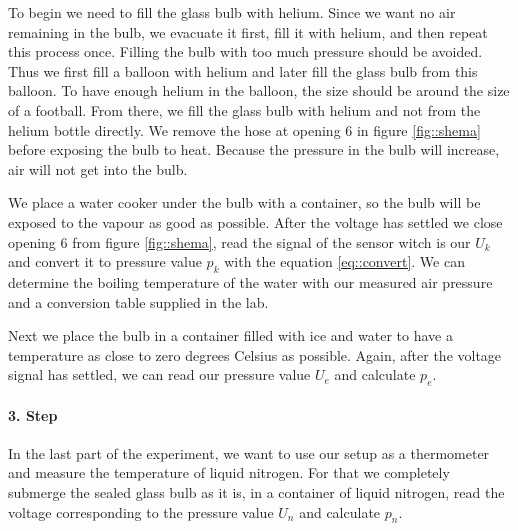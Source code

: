 To begin we need to fill the glass bulb with helium. 
Since we want no air remaining in the bulb, we evacuate it first, fill it with helium, and then repeat this process once. 
Filling the bulb with too much pressure should be avoided.
Thus we first fill a balloon with helium and later fill the glass bulb from this balloon. 
To have enough helium in the balloon, the size should be around the size of a football. 
From there, we fill the glass bulb with helium and not from the helium bottle directly. 
We remove the hose at opening 6 in figure \ref{fig::shema} before exposing the bulb to heat. 
Because the pressure in the bulb will increase, air will not get into the bulb. 


We place a water cooker under the bulb with a container, so the bulb will be exposed to the vapour as good as possible. 
After the voltage has settled we close opening 6 from figure \ref{fig::shema}, read the signal of the sensor witch is our $U_k$ and convert it to pressure value $p_k$ with the  equation \ref{eq::convert}. 
We can determine the boiling temperature of the water with our measured air pressure and a conversion table supplied in the lab. 


Next we place the bulb in a container filled with ice and water to have a temperature as close to zero degrees Celsius as possible. 
Again, after the voltage signal has settled, we can read our pressure value $U_e$ and calculate $p_e$.

\paragraph{3. Step}
In the last part of the experiment, we want to use our setup as a thermometer and measure the temperature of liquid nitrogen. For that we completely submerge the sealed glass bulb as it is, in a container of liquid nitrogen, read the voltage corresponding to the pressure value $U_n$ and calculate $p_n$.


